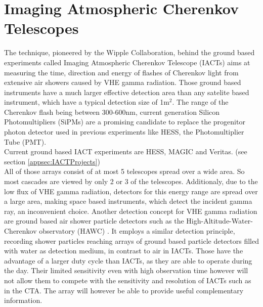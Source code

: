 \documentclass[12pt,article,type=msc,colorback,accentcolor=tud9c]{tudthesis}
\begin{document}


\clearpage
\section{\Large Imaging Atmospheric Cherenkov Telescopes}






The technique, pioneered by the Wipple Collaboration, behind the ground based experiments called Imaging Atmospheric Cherenkov Telescope (IACTs) aims at measuring the time, direction and energy of flashes of Cherenkov light from extensive air showers caused by VHE gamma radiation. Those ground based instruments have a much larger effective detection area than any satelite based instrument, which have a typical detection size of 1m$^2$. The range of the Cherenkov flash being between 300-600nm, current generation Silicon Photomultipliers (SiPMs) are a promising candidate to replace the progenitor photon detector used in previous experiments like HESS, the Photomultiplier Tube (PMT).\\
Current ground based IACT experiments are HESS, MAGIC and Veritas. (see section {\ref{appsec:IACTProjects}})\\
All of those arrays consist of at most 5 telescopes spread over a wide area. So most cascades are viewed by only 2 or 3 of the telescopes. Additionaly, due to the low flux of VHE gamma radiation, detectors for this energy range are spread over a large area, making space based instruments, which detect the incident gamma ray, an inconvenient choice. Another detection concept for VHE gamma radiation are ground based air shower particle detectors such as the High-Altitude-Water-Cherenkov observatory (HAWC) \cite{HAWC}. It employs a similar detection principle, recording shower particles reaching arrays of ground based particle detectors filled with water as detection medium, in contrast to air in IACTs. Those have the advantage of a larger duty cycle than IACTs, as they are able to operate during the day. Their limited sensitivity even with high observation time however will not allow them to compete with the sensitivity and resolution of IACTs such as in the CTA. The array will however be able to provide useful complementary information. 
\end{document}

